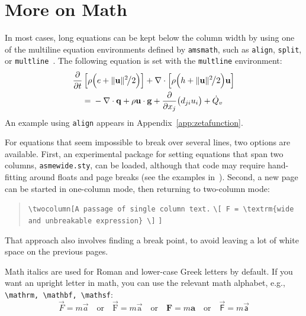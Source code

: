 \documentclass[balance,nocopyright,upint,varvw,hyphenate,barcolor=Goldenrod3,german]{asmejour}%
\begin{document}
\section{More on Math}

In most cases, long equations can be kept below the column width by using one of the multiline equation environments defined by \texttt{amsmath},
such as \texttt{align}, \texttt{split}, or \texttt{multline}~\cite{amsmath}. The following equation is set with the \texttt{multline} environment:
\begin{multline}
\frac{\partial}{\partial t}\left[\rho\Bigl(e + \lVert\mathbf{u}\rVert^2\mspace{-3mu}\big/2\Bigr)\right]  + \nabla\cdot\left[\rho\Bigl(h + \lVert\mathbf{u}\rVert^2\mspace{-3mu}\big/2 \Bigr)\mathbf{u}\right]\\
 ={}-\nabla \cdot \mathbf{q} +  \rho \mathbf{u}\cdot\mathbf{g}+ \frac{\partial}{\partial x_j}\bigl(d_{ji}u_i\bigr) + \dot{Q}_v\label{eqn:energy}
\end{multline}
An example using \texttt{align} appears in Appendix~\ref{app:zetafunction}.

For equations that seem impossible to break over several lines, two options are available.  First,
an experimental package for setting equations that span two columns, \texttt{asmewide.sty}, can be loaded, although that code may require hand-fitting around floats and page breaks (see the examples in~\cite{lienhard2025}). Second, a new page can be started in one-column mode, then returning to two-column mode:

\begin{quote}\raggedright
\verb|\twocolumn[A passage of single column text.|
\verb|\[ F = \textrm{wide and unbreakable expression} \]|
\verb|]|
\end{quote}
That approach also involves finding a break point, to avoid leaving a lot of white space on the previous pages.

Math italics are used for Roman and lower-case Greek letters by default.  If you want an upright letter in math, you can use the relevant math alphabet, e.g., \verb|\mathrm, \mathbf, \mathsf|:
\begin{equation}\label{eqn:newton2}
\vec{F} = m \vec{a} \quad\textrm{or}\quad \vec{\mathrm{F}} = m \vec{\mathrm{a}} \quad\textrm{or}\quad \mathbf{F} = m \mathbf{a} \quad\textrm{or}\quad \vec{\mathsf{F}} = m \vec{\mathsf{a}}
\end{equation}
\end{document}
